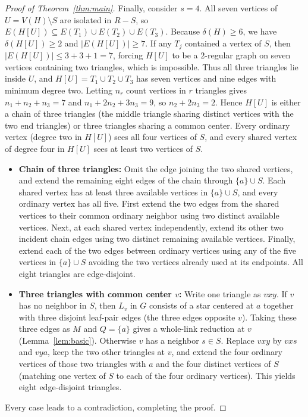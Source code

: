 \documentclass[11pt]{article}
\begin{document}
\begin{proof}[Proof of Theorem~\ref{thm:main}]
Finally, consider $s=4$. All seven vertices of $U=V(H)\setminus S$ are isolated in $R-S$, so $E(H[U])\subseteq E(T_1)\cup E(T_2)\cup E(T_3)$. Because $\delta(H)\geq 6$, we have $\delta(H[U])\geq 2$ and $|E(H[U])|\geq 7$. If any $T_j$ contained a vertex of $S$, then $|E(H[U])|\leq 3+3+1=7$, forcing $H[U]$ to be a $2$-regular graph on seven vertices containing two triangles, which is impossible. Thus all three triangles lie inside $U$, and $H[U]=T_1\cup T_2\cup T_3$ has seven vertices and nine edges with minimum degree two. Letting $n_r$ count vertices in $r$ triangles gives $n_1+n_2+n_3=7$ and $n_1+2n_2+3n_3=9$, so $n_2+2n_3=2$. Hence $H[U]$ is either a chain of three triangles (the middle triangle sharing distinct vertices with the two end triangles) or three triangles sharing a common center. Every ordinary vertex (degree two in $H[U]$) sees all four vertices of $S$, and every shared vertex of degree four in $H[U]$ sees at least two vertices of $S$.

\begin{itemize}
\item \textbf{Chain of three triangles:} Omit the edge joining the two shared vertices, and extend the remaining eight edges of the chain through $\{a\}\cup S$. Each shared vertex has at least three available vertices in $\{a\}\cup S$, and every ordinary vertex has all five. First extend the two edges from the shared vertices to their common ordinary neighbor using two distinct available vertices. Next, at each shared vertex independently, extend its other two incident chain edges using two distinct remaining available vertices. Finally, extend each of the two edges between ordinary vertices using any of the five vertices in $\{a\}\cup S$ avoiding the two vertices already used at its endpoints. All eight triangles are edge-disjoint.
\item \textbf{Three triangles with common center $v$:} Write one triangle as $vxy$. If $v$ has no neighbor in $S$, then $L_v$ in $G$ consists of a star centered at $a$ together with three disjoint leaf-pair edges (the three edges opposite $v$). Taking these three edges as $M$ and $Q=\{a\}$ gives a whole-link reduction at $v$ (Lemma~\ref{lem:basic}). Otherwise $v$ has a neighbor $s\in S$. Replace $vxy$ by $vxs$ and $vya$, keep the two other triangles at $v$, and extend the four ordinary vertices of those two triangles with $a$ and the four distinct vertices of $S$ (matching one vertex of $S$ to each of the four ordinary vertices). This yields eight edge-disjoint triangles.
\end{itemize}
Every case leads to a contradiction, completing the proof.
\end{proof}
\end{document}
